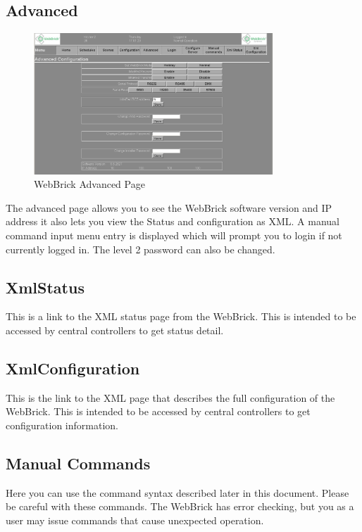 \subsection{Advanced}

\begin{figure}[H]
\centering
\includegraphics[width=0.8\textwidth]{Images/advanced.png}
\caption{WebBrick Advanced Page}
\end{figure}

The advanced page allows you to see the WebBrick software version and IP address it also lets you view the Status and configuration as XML. 
A manual command input menu entry is displayed which will prompt you to login if not currently logged in. 
The level 2 password can also be changed.

\subsection{XmlStatus}
This is a link to the XML status page from the WebBrick. This is intended to be accessed by central controllers to get status detail.

\subsection{XmlConfiguration}
This is the link to the XML page that describes the full configuration of the WebBrick.
This is intended to be accessed by central controllers to get configuration information.

\subsection{Manual Commands}

Here you can use the command syntax described later in this document.
Please be careful with these commands.  The WebBrick has error checking, but you as a user may issue commands that cause unexpected operation.

